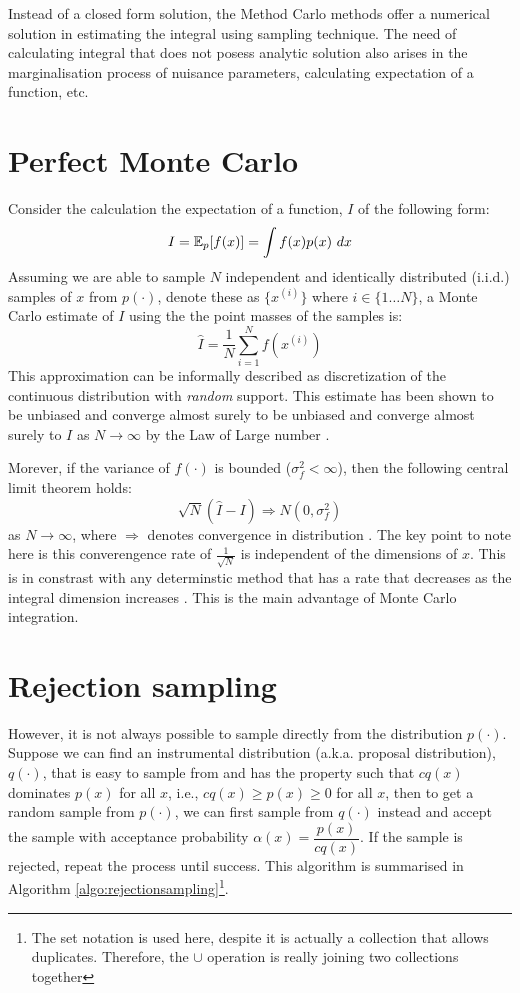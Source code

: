 Instead of a closed form solution, the Method Carlo methods offer a numerical solution in estimating the integral using sampling technique. The need of calculating integral that does not posess analytic solution also arises in the marginalisation process of nuisance parameters, calculating expectation of a function, etc.

\section{Perfect Monte Carlo}
Consider the calculation the expectation of a function, $I$ of the following form:
\begin{equation}
  I = \operatorname{\mathbb{E}}_p[f(x)] = \int f(x)p(x)~dx
\label{eq:expectation}
\end{equation}
Assuming we are able to sample $N$ independent and identically distributed (i.i.d.) samples of $x$ from $p(\cdot)$, denote these as $\{x^{(i)}\}$ where $i \in \{1 \ldots N\}$, a Monte Carlo estimate of $I$ using the the point masses of the samples is:
\begin{equation}
  \hat{I} = \frac{1}{N} \sum^N_{i=1} f(x^{(i)})
\end{equation}
This approximation can be informally described as discretization of the continuous distribution with \emph{random} support. This estimate has been shown to be unbiased and converge almost surely to be unbiased and converge almost surely to $I$ as $N \rightarrow \infty$ by the Law of Large number \cite{RCP05}. 

Morever, if the variance of $f(\cdot)$ is bounded ($\sigma^2_f < \infty$), then the following central limit theorem holds:
\begin{equation}
  \sqrt{N}(\hat{I} - I) \Longrightarrow N(0, \sigma^2_f)
\end{equation}
as $N \rightarrow \infty$, where $\Longrightarrow$ denotes convergence in distribution \cite{AD09}. The key point to note here is this converengence rate of $\frac{1}{\sqrt{N}}$ is independent of the dimensions of $x$. This is in constrast with any determinstic method that has a rate that decreases as the integral dimension increases \cite{RCP05}. This is the main advantage of Monte Carlo integration.

\section{Rejection sampling}
However, it is not always possible to sample directly from the distribution $p(\cdot)$. Suppose we can find an instrumental distribution (a.k.a. proposal distribution), $q(\cdot)$, that is easy to sample from and has the property such that $cq(x)$ dominates $p(x)$ for all $x$, i.e., $cq(x) \geq p(x) \geq 0$ for all $x$, then to get a random sample from $p(\cdot)$, we can first sample from $q(\cdot)$ instead and accept the sample with acceptance probability $\alpha(x)=\dfrac{p(x)}{cq(x)}$. If the sample is rejected, repeat the process until success. This algorithm is summarised in Algorithm \ref{algo:rejectionsampling}\footnote{The set notation is used here, despite it is actually a collection that allows duplicates. Therefore, the $\cup$ operation is really joining two collections together}.

